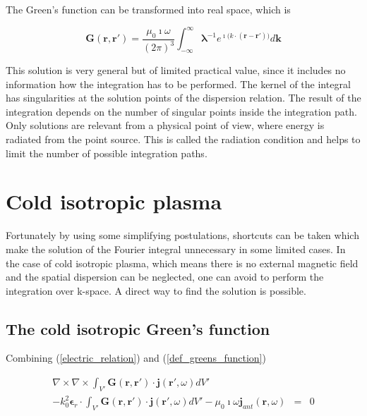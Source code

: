 \documentclass[a4paper,11pt]{thesis}
\begin{document}
The Green's function can be transformed into real space, which is

\begin{equation}\label{eq:general_greens_function}
    \mathbf{G}(\mathbf{r},\mathbf{r'})= \frac{\mu_0 \imath \omega }{(2\pi )^3}\int_{-\infty}^{\infty} \mathbf{\lambda}^{-1} e^{\imath \mathbf(k \cdot (\mathbf{r}-\mathbf{r}'))}d\mathbf{k}
\end{equation}

This solution is very general but of limited practical value, since it includes no information how the integration has to be performed. The kernel of the integral has singularities at the solution points of the dispersion relation. The result of the integration depends on the number of singular points inside the integration path.\\

Only solutions are relevant from a physical point of view, where energy is radiated from the point source. This is called the radiation condition and helps to limit the number of possible integration paths.

\section{Cold isotropic plasma}
Fortunately by using some simplifying postulations, shortcuts can be taken which make the solution of the Fourier integral unnecessary in some limited cases. In the case of cold isotropic plasma, which means there is no external magnetic field and the spatial dispersion can be neglected, one can avoid to perform the integration over k-space. A direct way to find the solution is possible.

\subsection{The cold isotropic Green's function}

Combining (\ref{electric_relation}) and (\ref{def_greens_function})

\begin{eqnarray}
\nabla \times \nabla \times \int_{V'} \mathbf{G}(\mathbf{r},\mathbf{r'})\cdot \mathbf{j}(\mathbf{r'},\omega) dV' \\
-   k_0^2 \mathbf{\epsilon}_r \cdot \int_{V'} \mathbf{G}(\mathbf{r},\mathbf{r'})\cdot \mathbf{j}(\mathbf{r'},\omega) dV' - \mu_0 \imath \omega   \mathbf{j}_{ant}(\mathbf{r},\omega) &=& 0\nonumber
\end{eqnarray}
\end{document}

